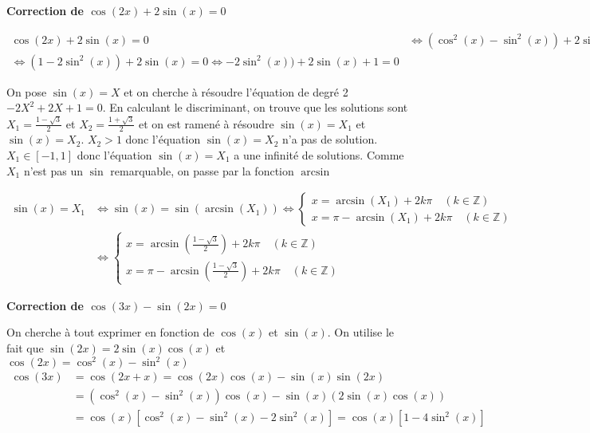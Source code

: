\documentclass[a4paper,12pt]{article}
\begin{document}
\textbf{Correction de $\cos(2x) + 2\sin(x) = 0$}

\begin{align*}
\cos(2x) + 2\sin(x) = 0 &
\Leftrightarrow (\cos^2(x) - \sin^2(x)) +2\sin(x) = 0 \\
\Leftrightarrow (1 - 2\sin^2(x)) +2\sin(x) = 0
\Leftrightarrow -2\sin^2(x)) +2\sin(x) + 1 = 0
\end{align*}

On pose $\sin(x) = X$ et on cherche à résoudre l'équation de degré 2 $-2X^2 + 2X + 1 = 0$. En calculant le discriminant, on trouve que les solutions sont $X_1 = \frac{1-\sqrt{3}}{2}$ et $X_2 = \frac{1+\sqrt{3}}{2}$ et on est ramené à résoudre $\sin(x) = X_1$ et $\sin(x) = X_2$. $X_2 > 1$ donc l'équation $\sin(x) = X_2$ n'a pas de solution. $X_1 \in [-1, 1]$ donc l'équation $\sin(x) = X_1$ a une infinité de solutions. Comme $X_1$ n'est pas un $\sin$ remarquable, on passe par la fonction $\arcsin$

\begin{align*}
\sin(x) = X_1 & \Leftrightarrow \sin(x) = \sin(\arcsin(X_1)) \Leftrightarrow \begin{cases} x = \arcsin(X_1) + 2k\pi \quad (k \in \mathbb{Z}) \\ x = \pi - \arcsin(X_1) + 2k\pi \quad (k \in \mathbb{Z}) \end{cases} \\
& \Leftrightarrow \begin{cases} x = \arcsin\left( \frac{1 - \sqrt{3}}{2} \right) + 2k\pi \quad (k \in \mathbb{Z}) \\ x = \pi - \arcsin\left( \frac{1 - \sqrt{3}}{2} \right) + 2k\pi \quad (k \in \mathbb{Z}) \end{cases}
\end{align*}

\textbf{Correction de $\cos(3x) - \sin(2x) = 0$}

On cherche à tout exprimer en fonction de $\cos(x)$ et $\sin(x)$. On utilise le fait que $\sin(2x) = 2\sin(x)\cos(x)$ et $\cos(2x) = \cos^2(x) - \sin^2(x)$
\begin{align*}
\cos(3x) & = \cos(2x + x) = \cos(2x)\cos(x) - \sin(x)\sin(2x) \\
         & = (\cos^2(x) - \sin^2(x))\cos(x) - \sin(x)(2\sin(x)\cos(x)) \\
         & = \cos(x)[ \cos^2(x) - \sin^2(x) - 2\sin^2(x)] = \cos(x)[ 1 - 4\sin^2(x)]
\end{align*}
\end{document}
